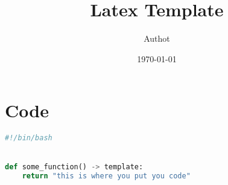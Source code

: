 \documentclass{article}
\title{Latex Template}
\author{Authot}
\date{\today}
\begin{document}
\maketitle




\newpage
\appendix
\section{Code}
\begin{lstlisting}[language=Python, label=appendix:python_example, caption={\raggedright Code Listing.}]
#!/bin/bash


def some_function() -> template:
    return "this is where you put you code"

\end{lstlisting}
\end{document}
